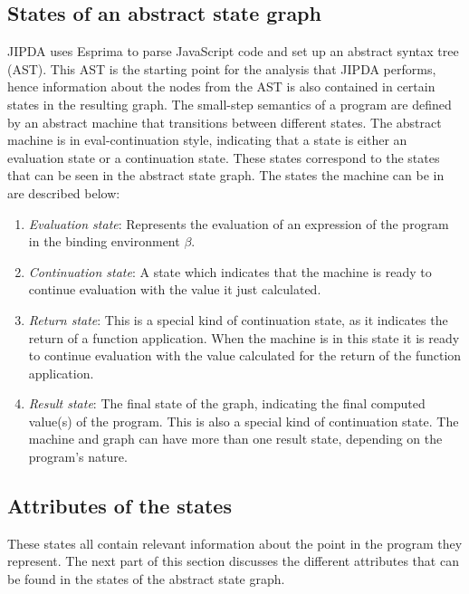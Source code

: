 \subsection{States of an abstract state graph}

JIPDA uses Esprima\cite{Esprima} to parse JavaScript code and set up an abstract syntax tree (AST). This AST is the starting point for the analysis that JIPDA performs, hence information about the nodes from the AST is also contained in certain states in the resulting graph. The small-step semantics of a program are defined by an abstract machine that transitions between different states. The abstract machine is in eval-continuation style, indicating that a state is either an evaluation state or a continuation state. These states correspond to the states that can be seen in the abstract state graph. The states the machine can be in are described below:

\begin{enumerate}
\item \textit{Evaluation state}: Represents the evaluation of an expression of the program in the binding environment $\beta$.
\item \textit{Continuation state}: A state which indicates that the machine is ready to continue evaluation with the value it just calculated.
\item \textit{Return state}: This is a special kind of continuation state, as it indicates the return of a function application. When the machine is in this state it is ready to continue evaluation with the value calculated for the return of the function application.
\item \textit{Result state}: The final state of the graph, indicating the final computed value(s) of the program. This is also a special kind of continuation state. The machine and graph can have more than one result state, depending on the program's nature. 
\end{enumerate}



\subsection{Attributes of the states}
These states all contain relevant information about the point in the program they represent. The next part of this section discusses the different attributes that can be found in the states of the abstract state graph. 

